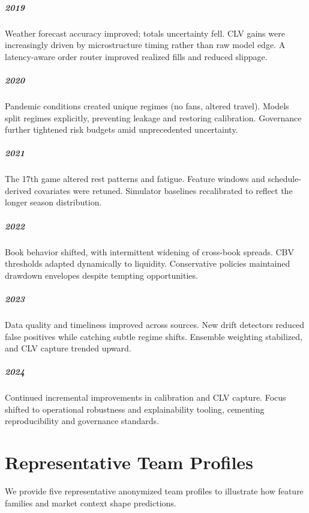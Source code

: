 \documentclass[12pt]{report}  %
\numberwithin{equation}{section}
\theoremstyle{plain}
\theoremstyle{definition}
\theoremstyle{remark}
\begin{document}
\paragraph{2019} Weather forecast accuracy improved; totals uncertainty fell. CLV gains were increasingly driven by microstructure timing rather than raw model edge. A latency-aware order router improved realized fills and reduced slippage.

\paragraph{2020} Pandemic conditions created unique regimes (no fans, altered travel). Models split regimes explicitly, preventing leakage and restoring calibration. Governance further tightened risk budgets amid unprecedented uncertainty.

\paragraph{2021} The 17th game altered rest patterns and fatigue. Feature windows and schedule-derived covariates were retuned. Simulator baselines recalibrated to reflect the longer season distribution.

\paragraph{2022} Book behavior shifted, with intermittent widening of cross-book spreads. CBV thresholds adapted dynamically to liquidity. Conservative policies maintained drawdown envelopes despite tempting opportunities.

\paragraph{2023} Data quality and timeliness improved across sources. New drift detectors reduced false positives while catching subtle regime shifts. Ensemble weighting stabilized, and CLV capture trended upward.

\paragraph{2024} Continued incremental improvements in calibration and CLV capture. Focus shifted to operational robustness and explainability tooling, cementing reproducibility and governance standards.


\chapter{Representative Team Profiles}\label{app:team-profiles}
We provide five representative anonymized team profiles to illustrate how feature families and market context shape predictions.
\end{document}
